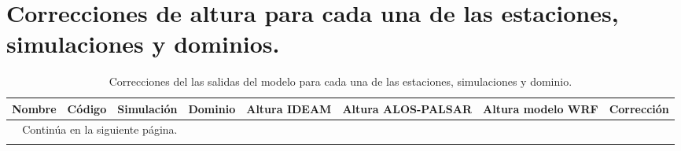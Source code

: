 
\chapter{Correcciones de altura para cada una de las estaciones, simulaciones y dominios.}
\label{anexo:correccion_altura}

\begin{landscape}

\begin{longtable}{lrlp{2cm}p{2cm}p{3cm}p{2cm}r}

\caption{Correcciones del las salidas del modelo para cada una de las estaciones, simulaciones y dominio.}
\label{tab:correccion_alturas}\\

\hline
                  Nombre &       Código &         Simulación & Dominio &  Altura IDEAM &  Altura ALOS-PALSAR &      Altura modelo WRF &  Corrección \\
\midrule
\endhead
\midrule
\multicolumn{3}{r}{{Continúa en la siguiente página.}} \\
\midrule
\endfoot


\end{longtable}
\end{landscape}
